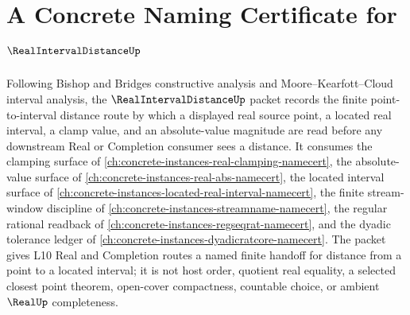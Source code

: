 \chapter{A Concrete Naming Certificate for $\RealIntervalDistanceUp$}
\label{ch:concrete-instances-real-interval-distance-namecert}

Following Bishop and Bridges constructive analysis and Moore--Kearfott--Cloud interval analysis, the $\RealIntervalDistanceUp$ packet records the finite point-to-interval distance route by which a displayed real source point, a located real interval, a clamp value, and an absolute-value magnitude are read before any downstream Real or Completion consumer sees a distance. It consumes the clamping surface of \autoref{ch:concrete-instances-real-clamping-namecert}, the absolute-value surface of \autoref{ch:concrete-instances-real-abs-namecert}, the located interval surface of \autoref{ch:concrete-instances-located-real-interval-namecert}, the finite stream-window discipline of \autoref{ch:concrete-instances-streamname-namecert}, the regular rational readback of \autoref{ch:concrete-instances-regseqrat-namecert}, and the dyadic tolerance ledger of \autoref{ch:concrete-instances-dyadicratcore-namecert}. The packet gives L10 Real and Completion routes a named finite handoff for distance from a point to a located interval; it is not host order, quotient real equality, a selected closest point theorem, open-cover compactness, countable choice, or ambient $\RealUp$ completeness.

